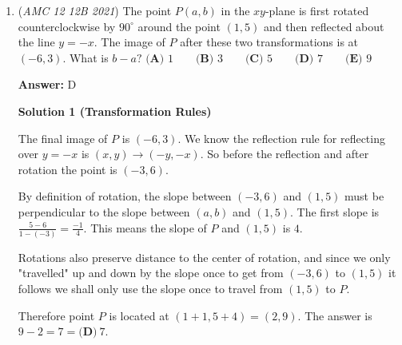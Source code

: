 \begin{enumerate}
\textbf{Solution 4 (Convenient Values)}

WLOG, assume there are $3$ students in the morning class and $4$ in the afternoon class. Then the average is $\frac{3\cdot 84 + 4\cdot 70}{7}=\boxed{\textbf{(C)} ~76}.$




\textbf{Solution 5 (Basic manipulation)}

Let $S_1$ be the sum of the morning class's scores, and $S_2$ be the sum of the afternoon class's scores. Let $3x$ be the number of students in the morning class, and $4x$ be the number of students in the afternoon class. We can write $\frac{S_1}{3x}=84$ and $\frac{S_2}{4x}=70$, so $S_2 = 70 \cdot 4x$ and $S_1 = 84 \cdot 3x$. Adding these, we get $S_1 + S_2 = x(70 \cdot 4 + 84 \cdot 3)$. We want to find the mean, which is $\frac{S_1+S_2}{7x}$, so dividing by $7x$ on both sides of the equation, we get the mean to be $10 \cdot 4 + 12 \cdot 3 = \boxed{\textbf{(C)} ~76}.$



	\item (\textit{AMC 12 12B 2021}) The point $P(a,b)$ in the $xy$-plane is first rotated counterclockwise by $90^\circ$ around the point $(1,5)$ and then reflected about the line $y=-x$. The image of $P$ after these two transformations is at $(-6,3)$. What is $b-a?$
$\textbf{(A) }1 \qquad \textbf{(B) }3 \qquad \textbf{(C) }5 \qquad \textbf{(D) }7 \qquad \textbf{(E) }9$

 \textbf{Answer: }D



\textbf{Solution 1 (Transformation Rules)}

The final image of $P$ is $(-6,3)$. We know the reflection rule for reflecting over $y=-x$ is $(x,y) \rightarrow (-y, -x)$. So before the reflection and after rotation the point is $(-3,6)$.

 By definition of rotation, the slope between $(-3,6)$ and $(1,5)$ must be perpendicular to the slope between $(a,b)$ and $(1,5)$. The first slope is $\frac{5-6}{1-(-3)} = \frac{-1}{4}$. This means the slope of $P$ and $(1,5)$ is $4$.

 Rotations also preserve distance to the center of rotation, and since we only "travelled" up and down by the slope once to get from $(-3,6)$ to $(1,5)$ it follows we shall only use the slope once to travel from $(1,5)$ to $P$.

 Therefore point $P$ is located at $(1+1, 5+4) = (2,9)$. The answer is $9-2 = 7 = \boxed{\textbf{(D)} ~7}$.


\end{enumerate}
